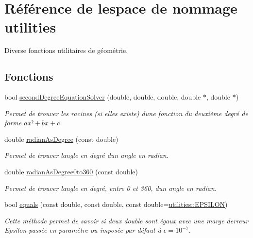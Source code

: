\hypertarget{namespaceutilities}{}\section{Référence de l\textquotesingle{}espace de nommage utilities}
\label{namespaceutilities}


Diverse fonctions utilitaires de géométrie.  


\subsection*{Fonctions}
\begin{DoxyCompactItemize}
\item 
bool \hyperlink{namespaceutilities_a040360cbd22e36e7d8e399b553217242}{second\+Degree\+Equation\+Solver} (double, double, double, double $\ast$, double $\ast$)
\begin{DoxyCompactList}\small\item\em Permet de trouver les racines (si elles existe) d\textquotesingle{}une fonction du deuxième degré de forme $ax² + bx + c$. \end{DoxyCompactList}\item 
double \hyperlink{namespaceutilities_aa2ec82a874dad6aae298db007bc0aef6}{radian\+As\+Degree} (const double)
\begin{DoxyCompactList}\small\item\em Permet de trouver l\textquotesingle{}angle en degré d\textquotesingle{}un angle en radian. \end{DoxyCompactList}\item 
double \hyperlink{namespaceutilities_a743a501d731442689287e6306e01c2d4}{radian\+As\+Degree0to360} (const double)
\begin{DoxyCompactList}\small\item\em Permet de trouver l\textquotesingle{}angle en degré, entre 0 et 360, d\textquotesingle{}un angle en radian. \end{DoxyCompactList}\item 
bool \hyperlink{namespaceutilities_a30b551fcbf5672117358b7b660d5dbf1}{equals} (const double, const double, const double=\hyperlink{namespaceutilities_adf3b0db93e9d9a6057599d3629607c72}{utilities\+::\+E\+P\+S\+I\+L\+O\+N})
\begin{DoxyCompactList}\small\item\em Cette méthode permet de savoir si deux double sont égaux avec une marge d\textquotesingle{}erreur Epsilon passée en paramètre ou imposée par défaut à $ \epsilon = 10^{-7}$. \end{DoxyCompactList}\item 

\end{DoxyCompactItemize}
